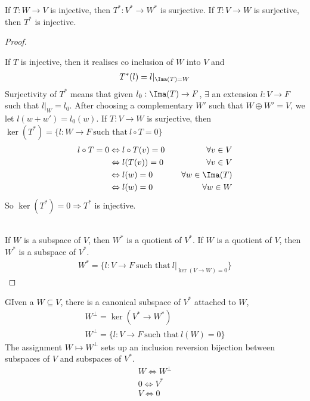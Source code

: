 \documentclass[class=scrartcl, crop=false]{standalone}
\begin{document}
\begin{lemma}
  \begin{enumerate}
    \ii[]
    \ii
    If $T: W \to V$ is injective, then $T^*: V^* \to W^*$ is surjective.
    \ii
    If $T: V \to W$ is surjective, then $T^*$ is injective.
  \end{enumerate} 
  \leavevmode
  \begin{proof}
    \begin{enumerate}
      \ii[]
      \ii
      If $T$ is injective, then it realises co inclusion of $W$ into $V$ and 
      \begin{gather*}
        T^*(l) = l|_{\Ima(T) = W}
      \end{gather*} 
      Surjectivity of $T^*$ means that given $l_0: \Ima(T) \to F$, $\exists$ an extension $l: V \to F$ such that $l|_W = l_0$. After choosing a complementary $W'$ such that $W \oplus W' = V$, we let $l(w + w') = l_0(w)$.
      \ii
      If $T: V \to W$ is surjective, then $\ker(T^*) = \{l: W \to F \ \text{such that} \ l \circ T = 0\}$ 
      \begin{align*}
        l \circ T = 0 & \Leftrightarrow l \circ T(v) = 0 \quad & \forall v \in V \\
                      & \Leftrightarrow l(T(v)) = 0 \quad & \forall v \in V \\
        & \Leftrightarrow l(w) = 0 \quad    & \forall w \in \Ima(T) \\
        & \Leftrightarrow l(w) = 0 \quad    & \forall w \in W
      \end{align*} 
      So $\ker(T^*) = 0 \Rightarrow T^*$ is injective.
    \end{enumerate} 
    \leavevmode \\
    If $W$ is a subspace of $V$, then $W^*$ is a quotient of $V^*$. If $W$ is a quotient of $V$, then $W^*$ is a subspace of $V^*$.
    \begin{gather*}
      W^* = \{l: V \to F \ \text{such that} \ l|_{\ker(V \to W) = 0}\}
    \end{gather*} 
  \end{proof} 
\end{lemma} 

GIven a $W \subseteq V$, there is a canonical subspace of $V^*$ attached to $W$, 
\begin{gather*}
  W^{\perp} = \ker(V^* \to W^*) \\
  W^{\perp} = \{l: V \to F \ \text{such that} \ l(W) = 0\}
\end{gather*} 
The assignment $W \mapsto W^{\perp}$ sets up an inclusion reversion bijection between subspaces of $V$ and subspaces of $V^*$.
\begin{gather*}
  W \Leftrightarrow W^{\perp} \\
  0 \Leftrightarrow V^* \\
  V \Leftrightarrow 0
\end{gather*} 
\end{document}
